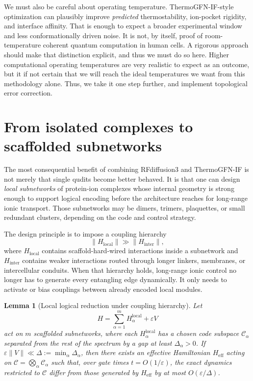 \documentclass[11pt]{report}
\newcommand{\Code}{\mathcal{C}}
\newtheorem{lemma}[theorem]{Lemma}
\theoremstyle{definition}
\begin{document}
We must also be careful about operating temperature. ThermoGFN-IF-style optimization can plausibly improve \emph{predicted} thermostability, ion-pocket rigidity, and interface affinity. That is enough to expect a broader experimental window and less conformationally driven noise. It is not, by itself, proof of room-temperature coherent quantum computation in human cells. A rigorous approach should make that distinction explicit, and thus we must do so here. Higher computational operating temperatures are very realistic to expect as an outcome, but it if not certain that we will reach the ideal temperatures we want from this methodology alone. Thus, we take it one step further, and implement topological error correction. 

\section{From isolated complexes to scaffolded subnetworks}
The most consequential benefit of combining RFdiffusion3 and ThermoGFN-IF is not merely that single qudits become better behaved. It is that one can design \emph{local subnetworks} of protein-ion complexes whose internal geometry is strong enough to support logical encoding before the architecture reaches for long-range ionic transport. Those subnetworks may be dimers, trimers, plaquettes, or small redundant clusters, depending on the code and control strategy.

The design principle is to impose a coupling hierarchy
\[
\|H_{\mathrm{local}}\| \gg \|H_{\mathrm{inter}}\|,
\]
where $H_{\mathrm{local}}$ contains scaffold-hard-wired interactions inside a subnetwork and $H_{\mathrm{inter}}$ contains weaker interactions routed through longer linkers, membranes, or intercellular conduits. When that hierarchy holds, long-range ionic control no longer has to generate every entangling edge dynamically. It only needs to activate or bias couplings between already encoded local modules.

\begin{lemma}[Local logical reduction under coupling hierarchy]
\label{lem:localreduction}
Let
\[
H = \sum_{\alpha=1}^{m} H_{\alpha}^{\mathrm{local}} + \varepsilon V
\]
act on $m$ scaffolded subnetworks, where each $H_{\alpha}^{\mathrm{local}}$ has a chosen code subspace $\Code_{\alpha}$ separated from the rest of the spectrum by a gap at least $\Delta_{\alpha}>0$. If $\varepsilon \|V\| \ll \Delta := \min_{\alpha}\Delta_{\alpha}$, then there exists an effective Hamiltonian $H_{\mathrm{eff}}$ acting on $\Code=\bigotimes_{\alpha}\Code_{\alpha}$ such that, over gate times $t=O(1/\varepsilon)$, the exact dynamics restricted to $\Code$ differ from those generated by $H_{\mathrm{eff}}$ by at most $O(\varepsilon/\Delta)$.
\end{lemma}
\end{document}
